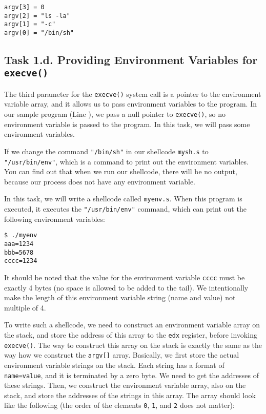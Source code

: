 \begin{lstlisting}
argv[3] = 0
argv[2] = "ls -la"
argv[1] = "-c"
argv[0] = "/bin/sh"
\end{lstlisting}
 


\subsection{Task 1.d. Providing Environment Variables for \texttt{execve()}}

The third parameter for the \texttt{execve()} system call
is a pointer to the environment variable array, and it allows 
us to pass environment variables to the program. In our 
sample program (Line ), we
pass a null pointer to \texttt{execve()}, so
no environment variable is passed to the program. 
In this task, we will pass some environment variables. 

If we change the command \texttt{"/bin/sh"} in our shellcode
\texttt{mysh.s} to \texttt{"/usr/bin/env"}, which is a command to print out the 
environment variables. You can find out that when we run
our shellcode, there will be no output, because our 
process does not have any environment variable.


In this task, we will write a shellcode called \texttt{myenv.s}. When this 
program is executed, it executes the \texttt{"/usr/bin/env"} command, which
can print out the following environment variables: 

\begin{lstlisting}
$ ./myenv
aaa=1234
bbb=5678
cccc=1234
\end{lstlisting}

It should be noted that the value for the environment variable \texttt{cccc}
must be exactly 4 bytes (no space is allowed to be added to the tail).
We intentionally make the length of this environment variable string (name and value)
not multiple of 4.


To write such a shellcode, we need to construct an
environment variable array on the stack, 
and store the address of this array to the \texttt{edx} register,  
before invoking \texttt{execve()}.  
The way to construct this array on the stack is exactly the same
as the way how we construct the \texttt{argv[]} array. Basically,
we first store the actual environment variable strings on the stack.
Each string has a format of \texttt{name=value}, and it is terminated by
a zero byte. We need to get the addresses of these 
strings. Then, we construct the 
environment variable array, also on the stack, and store the 
addresses of the strings in this array.  
The array should look like the following (the order of 
the elements \texttt{0}, \texttt{1}, and \texttt{2} does not matter): 

